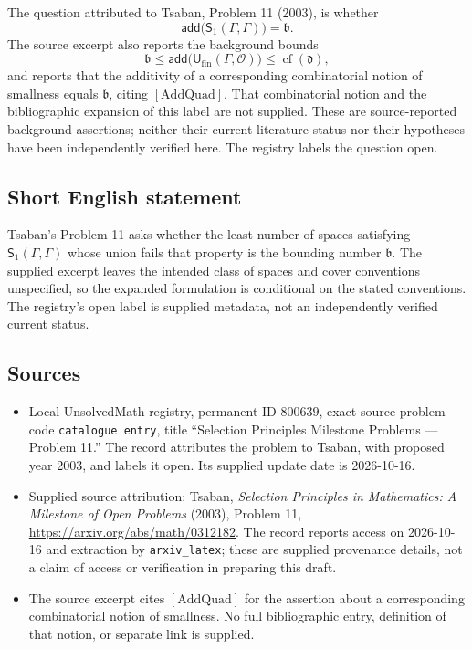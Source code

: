 \documentclass[11pt]{article}
\begin{document}
The question attributed to Tsaban, Problem 11 (2003), is whether
\[
\mathsf{add}\bigl(\mathsf S_1(\Gamma,\Gamma)\bigr)=\mathfrak b.
\]
The source excerpt also reports the background bounds
\[
\mathfrak b\leq\mathsf{add}\bigl(\mathsf U_{\mathrm{fin}}(\Gamma,\mathcal O)\bigr)\leq\operatorname{cf}(\mathfrak d),
\]
and reports that the additivity of a corresponding combinatorial notion of smallness equals \(\mathfrak b\), citing \([\mathrm{AddQuad}]\). That combinatorial notion and the bibliographic expansion of this label are not supplied. These are source-reported background assertions; neither their current literature status nor their hypotheses have been independently verified here. The registry labels the question open.
\subsection{Short English statement}
Tsaban's Problem 11 asks whether the least number of spaces satisfying \(\mathsf S_1(\Gamma,\Gamma)\) whose union fails that property is the bounding number \(\mathfrak b\). The supplied excerpt leaves the intended class of spaces and cover conventions unspecified, so the expanded formulation is conditional on the stated conventions. The registry's open label is supplied metadata, not an independently verified current status.
\subsection{Sources}
\begin{itemize}
\item Local UnsolvedMath registry, permanent ID \(800639\), exact source problem code \texttt{catalogue entry}, title ``Selection Principles Milestone Problems --- Problem 11.'' The record attributes the problem to Tsaban, with proposed year 2003, and labels it open. Its supplied update date is 2026-10-16.
\item Supplied source attribution: Tsaban, \emph{Selection Principles in Mathematics: A Milestone of Open Problems} (2003), Problem 11, \url{https://arxiv.org/abs/math/0312182}. The record reports access on 2026-10-16 and extraction by \texttt{arxiv\_latex}; these are supplied provenance details, not a claim of access or verification in preparing this draft.
\item The source excerpt cites \([\mathrm{AddQuad}]\) for the assertion about a corresponding combinatorial notion of smallness. No full bibliographic entry, definition of that notion, or separate link is supplied.
\end{itemize}
\end{document}

